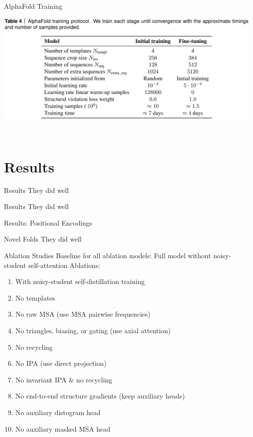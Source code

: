 \documentclass[presentation, smaller]{beamer}
\begin{document}
\begin{frame}[label={sec:org9432228}]{AlphaFold Training}
\begin{center}
\includegraphics[width=.9\linewidth]{./imgs/af-training-table.png}
\end{center}~\cite{jumperHighlyAccurateProtein2021}
\end{frame}

\section*{Results}
\label{sec:org10be86e}
\begin{frame}[label={sec:org7486702}]{Results}
They did well~\cite{jumperHighlyAccurateProtein2021}
\end{frame}

\begin{frame}[label={sec:orgef8887a}]{Results}
They did well~\cite{jumperHighlyAccurateProtein2021}
\end{frame}

\begin{frame}[label={sec:orgd3313c9}]{Results: Positional Encodings}~\cite{jumperHighlyAccurateProtein2021}
\end{frame}

\begin{frame}[label={sec:org163c054}]{Novel Folds}
They did well~\cite{jumperHighlyAccurateProtein2021}
\end{frame}

\begin{frame}[label={sec:org7868e7a}]{Ablation Studies}
  Baseline for all ablation models: Full model without noisy-student self-attention
  Ablations:
  \begin{enumerate}
  \item With noisy-student self-distillation training
  \item No templates
  \item No raw MSA (use MSA pairwise frequencies)
  \item No triangles, biasing, or gating (use axial attention)
  \item No recycling
  \item No IPA (use direct projection)
  \item No invariant IPA \& no recycling
  \item No end-to-end structure gradients (keep auxiliary heads)
  \item No auxiliary distogram head
  \item No auxiliary masked MSA head
  \end{enumerate}~\cite{jumperHighlyAccurateProtein2021}
\end{frame}
\end{document}
